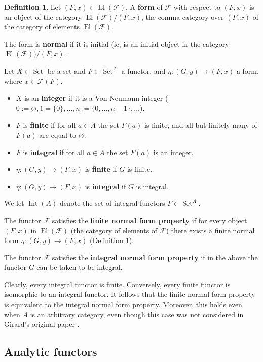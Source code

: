 \documentclass[12pt]{article}
\theoremstyle{plain}
\theoremstyle{definition}
\newtheorem{defn}[thm]{Definition} %
\newcommand{\scr}[1]{\mathscr{#1}}
\newcommand{\lto}{\longrightarrow}
\DeclareMathOperator{\set}{Set}
\begin{document}
\begin{defn}\label{def:forms}
		Let $(F,x) \in \operatorname{El}(\scr{F})$. A \textbf{form} of $\scr{F}$ with respect to $(F,x)$ is an object of the category $\operatorname{El}(\scr{F})/(F,x)$, the comma category over $(F,x)$ of the category of elements $\operatorname{El}(\scr{F})$.
		
		The form is \textbf{normal} if it is initial (ie, is an initial object in the category $\operatorname{El}(\scr{F}))/(F,x)$.

  Let $X \in \set$ be a set and $F \in \set^A$ a functor, and $\eta: (G,y) \lto (F,x)$ a form, where $x \in \scr{F}(F)$.
		\begin{itemize}
			\item $X$ is an \textbf{integer} if it is a Von Neumann integer ($0 := \varnothing, 1 = \{0\}, \ldots, n := \{ 0, \ldots, n-1\}, \ldots$).
		\item $F$ is \textbf{finite} if for all $a \in A$ the set $F(a)$ is finite, and all but finitely many of $F(a)$ are equal to $\varnothing$.
		\item $F$ is \textbf{integral} if for all $a \in A$ the set $F(a)$ is an integer.
		\item $\eta: (G,y) \lto (F,x)$ is \textbf{finite} if $G$ is finite.
		\item $\eta: (G,y) \lto (F,x)$ is \textbf{integral} if $G$ is integral.
			\end{itemize}
		We let $\operatorname{Int}(A)$ denote the set of integral functors $F \in \set^A$.

		The functor $\scr{F}$ satisfies the \textbf{finite normal form property} if for every object $(F,x)$ in $\operatorname{El}(\scr{F})$ (the category of elements of $\scr{F}$) there exists a finite normal form $\eta: (G,y) \lto (F,x)$ (Definition \ref{def:forms}).
		
		The functor $\scr{F}$ satisfies the \textbf{integral normal form property} if in the above the functor $G$ can be taken to be integral.
		\end{defn}
	
Clearly, every integral functor is finite. Conversely, every finite functor is isomorphic to an integral functor. It follows that the finite normal form property is equivalent to the integral normal form property. Moreover, this holds even when $A$ is an arbitrary category, even though this case was not considered in Girard's original paper \cite{Girard}.

\subsection{Analytic functors}
\end{document}
